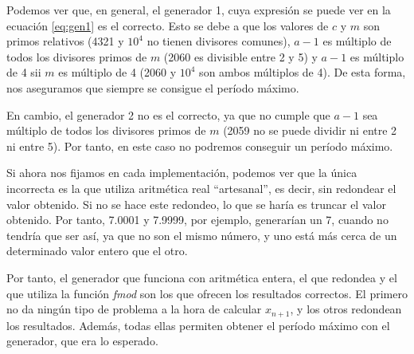 \documentclass[11pt,a4paper]{report}
\begin{document}
Podemos ver que, en general, el generador 1, cuya expresión se puede ver en la ecuación \ref{eq:gen1} es el correcto. Esto se debe
a que los valores de $c$ y $m$ son primos relativos (4321 y $10^4$ no tienen divisores comunes), $a - 1$ es múltiplo de todos
los divisores primos de $m$ (2060 es divisible entre 2 y 5) y $a - 1$ es múltiplo de 4 sii $m$ es múltiplo de 4 (2060 y $10^4$
son ambos múltiplos de 4). De esta forma, nos aseguramos que siempre se consigue el período máximo.

En cambio, el generador 2 no es el correcto, ya que no cumple que $a-1$ sea múltiplo de todos los divisores primos de $m$ (2059
no se puede dividir ni entre 2 ni entre 5). Por tanto, en este caso no podremos conseguir un período máximo.

Si ahora nos fijamos en cada implementación, podemos ver que la única incorrecta es la que utiliza aritmética real ``artesanal'',
es decir, sin redondear el valor obtenido. Si no se hace este redondeo, lo que se haría es truncar el valor obtenido. Por tanto,
7.0001 y 7.9999, por ejemplo, generarían un 7, cuando no tendría que ser así, ya que no son el mismo número, y uno está más
cerca de un determinado valor entero que el otro.

Por tanto, el generador que funciona con aritmética entera, el que redondea y el que utiliza la función \textit{fmod} son los
que ofrecen los resultados correctos. El primero no da ningún tipo de problema a la hora de calcular $x_{n+1}$, y los otros
redondean los resultados. Además, todas ellas permiten obtener el período máximo con el generador, que era lo esperado.
\end{document}
